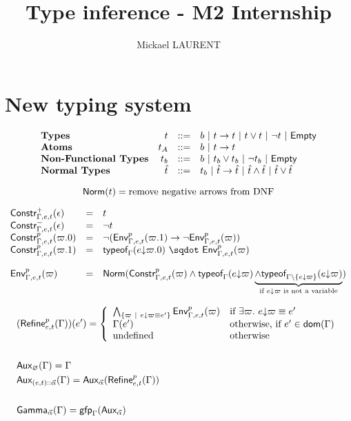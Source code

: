 \documentclass[a4paper]{article}
\title{\vspace{1.5cm}Type inference - M2 Internship}
\author{Mickael LAURENT}
\date{\vspace{-5ex}}
\theoremstyle{definition}
\begin{document}
	\maketitle

    \section{New typing system}

    \[
      \begin{array}{lrcl}
      \textbf{Types} & t & ::= & b~|~ t\to t~|~ t\vee t ~|~ \neg t ~|~ \textsf{Empty}\\
      \textbf{Atoms} & t_A & ::= & b~|~ t\to t\\
      \textbf{Non-Functional Types} & t_b & ::= & b ~|~ t_b\vee t_b ~|~ \neg t_b ~|~ \textsf{Empty}\\
      \textbf{Normal Types} & \hat t & ::= & t_b ~|~ \hat t\to \hat t~|~ \hat t \wedge \hat t ~|~ \hat t\vee \hat t
      \end{array}
    \]

    \[
      \textsf{Norm}(t) = \text{remove negative arrows from DNF}
    \]

    \[
    \begin{array}{lcl}
      \typep+\epsilon{\Gamma,e,t} & = & t\\
      \typep-\epsilon{\Gamma,e,t} & = & \neg t\\
      \typep{p}{\varpi.0}{\Gamma,e,t} & = & \neg(\arrow{\Gp p{\Gamma,e,t}{(\varpi.1)}}{\neg \Gp p {\Gamma,e,t} (\varpi)})\\
      \typep{p}{\varpi.1}{\Gamma,e,t} & = & \worra{\tyof{\occ e{\varpi.0}}\Gamma}{\Gp p {\Gamma,e,t} (\varpi)}\\ \\
      \Gp p {\Gamma,e,t} (\varpi) & = & \norm {\typep p \varpi {\Gamma,e,t} \land \tyof {\occ e \varpi} \Gamma
      \underbrace{\land \tyof {\occ e \varpi} {\Gamma\setminus\{\occ e \varpi\}}}_\text{if $\occ e \varpi$ is not a variable}}\\
    \end{array}
    \]

    \begin{align*}
      &(\textsf{Refine}^{p}_{e,t}(\Gamma))(e') = 
        \left\{\begin{array}{ll}
          \bigwedge_{\{\varpi ~|~ e{\downarrow}\varpi \equiv e'\}} \textsf{Env}^{p}_{\Gamma,e,t} (\varpi) & \text{if } \exists \varpi.\ e{\downarrow}\varpi \equiv e' \\
          \Gamma(e') & \text{otherwise, if } e' \in \textsf{dom}(\Gamma)\\
          \text{undefined} & \text{otherwise}
        \end{array}\right.\\&\\
      &\textsf{Aux}_{\varnothing}(\Gamma) = \Gamma\\
      &\textsf{Aux}_{{(e,t)}\textsf{::}{\vec \alpha}}(\Gamma) = \textsf{Aux}_{\vec \alpha}(\textsf{Refine}^{p}_{e,t}(\Gamma))\\&\\
      &\textsf{Gamma}_{\vec \alpha}(\Gamma)=\textsf{gfp}_\Gamma (\textsf{Aux}_{\vec \alpha})
    \end{align*}
\end{document}
